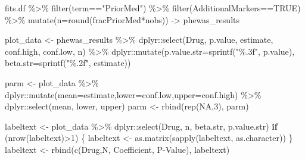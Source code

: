 \documentclass[
]{article}
\newenvironment{Shaded}{\begin{snugshade}}{\end{snugshade}}
\newcommand{\AttributeTok}[1]{\textcolor[rgb]{0.77,0.63,0.00}{#1}}
\newcommand{\ConstantTok}[1]{\textcolor[rgb]{0.00,0.00,0.00}{#1}}
\newcommand{\ControlFlowTok}[1]{\textcolor[rgb]{0.13,0.29,0.53}{\textbf{#1}}}
\newcommand{\DecValTok}[1]{\textcolor[rgb]{0.00,0.00,0.81}{#1}}
\newcommand{\FunctionTok}[1]{\textcolor[rgb]{0.00,0.00,0.00}{#1}}
\newcommand{\NormalTok}[1]{#1}
\newcommand{\OtherTok}[1]{\textcolor[rgb]{0.56,0.35,0.01}{#1}}
\newcommand{\SpecialCharTok}[1]{\textcolor[rgb]{0.00,0.00,0.00}{#1}}
\newcommand{\StringTok}[1]{\textcolor[rgb]{0.31,0.60,0.02}{#1}}
\begin{document}
\begin{Shaded}
\begin{Highlighting}[]
\NormalTok{fits.df  }\SpecialCharTok{\%\textgreater{}\%} 
  \FunctionTok{filter}\NormalTok{(term}\SpecialCharTok{==}\StringTok{"PriorMed"}\NormalTok{) }\SpecialCharTok{\%\textgreater{}\%} 
  \FunctionTok{filter}\NormalTok{(AdditionalMarkers}\SpecialCharTok{==}\ConstantTok{TRUE}\NormalTok{) }\SpecialCharTok{\%\textgreater{}\%} 
  \FunctionTok{mutate}\NormalTok{(}\AttributeTok{n=}\FunctionTok{round}\NormalTok{(fracPriorMed}\SpecialCharTok{*}\NormalTok{nobs)) }\OtherTok{{-}\textgreater{}}
\NormalTok{  phewas\_results}

\NormalTok{plot\_data }\OtherTok{\textless{}{-}}\NormalTok{ phewas\_results }\SpecialCharTok{\%\textgreater{}\%}
\NormalTok{    dplyr}\SpecialCharTok{::}\FunctionTok{select}\NormalTok{(Drug, p.value, estimate, conf.high, conf.low, n) }\SpecialCharTok{\%\textgreater{}\%}
\NormalTok{    dplyr}\SpecialCharTok{::}\FunctionTok{mutate}\NormalTok{(}\AttributeTok{p.value.str=}\FunctionTok{sprintf}\NormalTok{(}\StringTok{"\%.3f"}\NormalTok{, p.value), }\AttributeTok{beta.str=}\FunctionTok{sprintf}\NormalTok{(}\StringTok{"\%.2f"}\NormalTok{, estimate))}

\NormalTok{  parm }\OtherTok{\textless{}{-}}\NormalTok{ plot\_data }\SpecialCharTok{\%\textgreater{}\%}\NormalTok{ dplyr}\SpecialCharTok{::}\FunctionTok{mutate}\NormalTok{(}\AttributeTok{mean=}\NormalTok{estimate,}\AttributeTok{lower=}\NormalTok{conf.low,}\AttributeTok{upper=}\NormalTok{conf.high) }\SpecialCharTok{\%\textgreater{}\%}
\NormalTok{    dplyr}\SpecialCharTok{::}\FunctionTok{select}\NormalTok{(mean, lower, upper)}
\NormalTok{  parm }\OtherTok{\textless{}{-}} \FunctionTok{rbind}\NormalTok{(}\FunctionTok{rep}\NormalTok{(}\ConstantTok{NA}\NormalTok{,}\DecValTok{3}\NormalTok{), parm)}

\NormalTok{  labeltext }\OtherTok{\textless{}{-}}\NormalTok{ plot\_data }\SpecialCharTok{\%\textgreater{}\%}\NormalTok{ dplyr}\SpecialCharTok{::}\FunctionTok{select}\NormalTok{(Drug, n, beta.str, p.value.str)}
  \ControlFlowTok{if}\NormalTok{ (}\FunctionTok{nrow}\NormalTok{(labeltext)}\SpecialCharTok{\textgreater{}}\DecValTok{1}\NormalTok{) \{}
\NormalTok{    labeltext }\OtherTok{\textless{}{-}} \FunctionTok{as.matrix}\NormalTok{(}\FunctionTok{sapply}\NormalTok{(labeltext, as.character))}
\NormalTok{  \}}
\NormalTok{  labeltext }\OtherTok{\textless{}{-}} \FunctionTok{rbind}\NormalTok{(}\FunctionTok{c}\NormalTok{(}\StringTok{\textquotesingle{}Drug\textquotesingle{}}\NormalTok{,}\StringTok{\textquotesingle{}N\textquotesingle{}}\NormalTok{, }\StringTok{\textquotesingle{}Coefficient\textquotesingle{}}\NormalTok{, }\StringTok{\textquotesingle{}P{-}Value\textquotesingle{}}\NormalTok{), labeltext)}
\end{Highlighting}
\end{Shaded}
\end{document}
